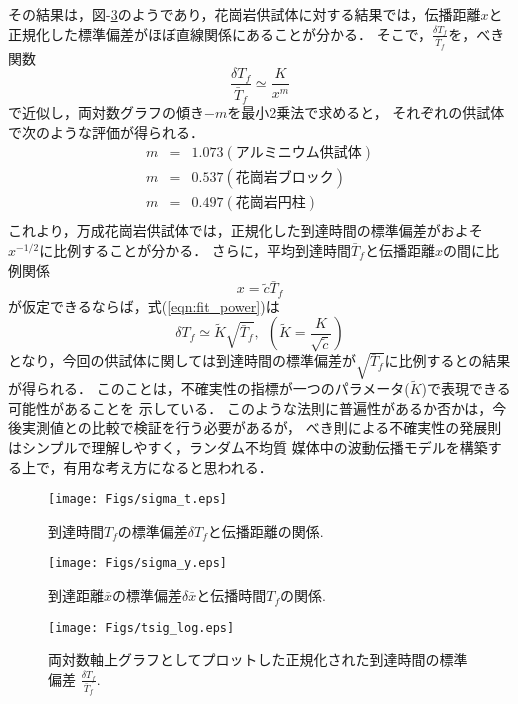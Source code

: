 その結果は，図-\ref{fig:fig17}のようであり，花崗岩供試体に対する結果では，伝播距離$x$と
正規化した標準偏差がほぼ直線関係にあることが分かる．
そこで，$\frac{\delta T_f}{\bar{T}_f}$を，べき関数
\begin{equation}
	\frac{\delta T_f }{\bar{T}_f} \simeq \frac{K}{x^m}
	\label{eqn:fit_power}
\end{equation}
で近似し，両対数グラフの傾き$-m$を最小2乗法で求めると，
それぞれの供試体で次のような評価が得られる．
\begin{eqnarray}
	m &=& 1.073 (アルミニウム供試体) \\
	m &=& 0.537 (花崗岩ブロック)\\
	m &=& 0.497 (花崗岩円柱)\\
\end{eqnarray}
これより，万成花崗岩供試体では，正規化した到達時間の標準偏差がおよそ$x^{-1/2}$に比例することが分かる．
さらに，平均到達時間$\bar T_f$と伝播距離$x$の間に比例関係
\begin{equation}
	x=\tilde c \bar T_f
	\label{linfit_x}
\end{equation}
が仮定できるならば，式(\ref{eqn:fit_power})は
\begin{equation}
	\delta T_f \simeq \tilde K \sqrt{ \bar{T}_f}, \  \ 
	\left( \tilde K=\frac{K}{\sqrt{\tilde c}}\right)
	\label{eqn:plaw} 
\end{equation}
となり，今回の供試体に関しては到達時間の標準偏差が$\sqrt{\bar{T}_f}$に比例するとの結果が得られる．
このことは，不確実性の指標が一つのパラメータ($\tilde K$)で表現できる可能性があることを
示している．
このような法則に普遍性があるか否かは，今後実測値との比較で検証を行う必要があるが，
べき則による不確実性の発展則はシンプルで理解しやすく，ランダム不均質
媒体中の波動伝播モデルを構築する上で，有用な考え方になると思われる．
\begin{figure}
\begin{center}
	\texttt{[image: Figs/sigma\_t.eps]}
	\vspace{-2mm}
	\caption{到達時間$T_f$の標準偏差$\delta T_f$と伝播距離の関係. }
	\label{fig:fig15}
\end{center}
	\vspace{-5mm}
\end{figure}
\begin{figure}
\begin{center}
	\texttt{[image: Figs/sigma\_y.eps]}
	\vspace{-2mm}
	\caption{到達距離$\bar{x}$の標準偏差$\delta \bar{x}$と伝播時間$T_f$の関係. }
	\label{fig:fig16}
\end{center}
	\vspace{-5mm}
\end{figure}
\begin{figure}
\begin{center}
	\texttt{[image: Figs/tsig\_log.eps]}
	\vspace{-2mm}
	\caption{
		両対数軸上グラフとしてプロットした正規化された到達時間の標準偏差
			$\frac{\delta T_f}{\bar{T}_f}$. 
		}
	\label{fig:fig17}
\end{center}
	\vspace{-8mm}
\end{figure}
